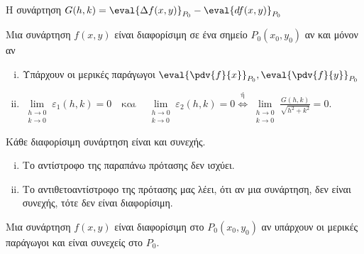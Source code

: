\begin{rem}
\item {}
  Η συνάρτηση $ G(h,k) = \eval{\Delta f(x,y)}_{P_{0}} - \eval{df(x,y)}_{P_{0}} $
\end{rem}

\begin{dfn}[Επαναδιατύπωση]
\item {}
  Μια συνάρτηση $ f(x,y) $ είναι διαφορίσιμη σε ένα σημείο $ P_{0}(x_{0}, y_{0}) $ αν
  και μόνον αν
  \begin{enumerate}[i)]
    \item Υπάρχουν οι μερικές παράγωγοι $ \eval{\pdv{f}{x}}_{P_{0}},
      \eval{\pdv{f}{y}}_{P_{0}} $
    \item $ \lim\limits_{\substack{h\to 0 \\k \to 0}} \varepsilon _{1}(h,k) = 
      0 \quad \text{και} \quad \lim\limits_{\substack{h\to 0 \\k \to 0}} 
      \varepsilon _{2}(h,k)=0 \overset{\text{ή}}{\Leftrightarrow} 
      \lim\limits_{\substack{h\to 0 \\k \to 0}} 
      \frac{G(h,k)}{\sqrt{h^{2}+k^{2}}} = 0 $.
  \end{enumerate}
\end{dfn}

\begin{prop}
  Κάθε διαφορίσιμη συνάρτηση είναι και συνεχής.
\end{prop}

\begin{rem}
\item {}
  \begin{enumerate}[i)]
    \item Το αντίστροφο της παραπάνω πρότασης δεν ισχύει.
    \item Το αντιθετοαντίστροφο της πρότασης μας λέει, ότι αν μια συνάρτηση, 
      δεν είναι συνεχής, τότε δεν είναι διαφορίσιμη.
  \end{enumerate}
\end{rem}
\begin{thm}
\item {}
  Μια συνάρτηση $ f(x,y) $ είναι διαφορίσιμη στο $ P_{0}(x_{0}, y_{0}) $ 
  αν υπάρχουν οι μερικές παράγωγοι και είναι συνεχείς στο $ P_{0} $.
\end{thm}


